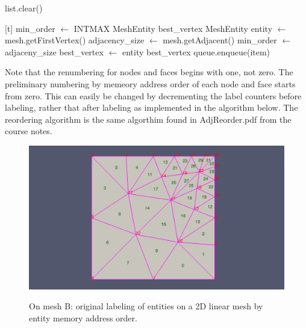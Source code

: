 \documentclass{article}
\begin{document}
\begin{algorithm}
\begin{algorithmic}

            \State {}
            \State list.clear()

        \EndIf

    \EndWhile
\EndProcedure
\State
{}[t]
    \State{}
    \State min\_order $\gets$ INTMAX
    \State MeshEntity best\_vertex
    \State MeshEntity entity $\gets$ mesh.getFirstVertex()
            \State adjacency\_size $\gets$ mesh.getAdjacent()
                \State min\_order $\gets$ adjaceny\_size
                \State best\_vertex $\gets$ entity
            \EndIf
        \EndIf
    \EndWhile
    \State\Return best\_vertex
\EndProcedure
\State
{}
            \State queue.enqueue(item)
        \EndIf
    \EndFor
\EndProcedure

\end{algorithmic}
\end{algorithm}

Note that the renumbering for nodes and faces begins with one, not zero. The preliminary numbering by memeory address order of each node and face starts from zero. This can easily be changed by decrementing the label counters before labeling, rather that after labeling as implemented in the algorithm below. The reordering algorithm is the same algorthim found in AdjReorder.pdf from the course notes. 

\FloatBarrier
\restoregeometry


\begin{figure}[ht]
\caption{On mesh B: original labeling of entities on a 2D linear mesh by entity memory address order.}
{\includegraphics[width = 15cm ]{pre_b}}
\centering
\end{figure}
\end{document}
